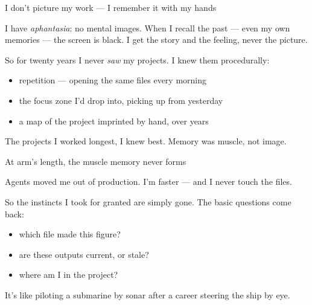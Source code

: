 \documentclass[aspectratio=169,11pt]{beamer}
\begin{document}
  \begin{frame}{I don't picture my work --- I remember it with my hands}

  I have \emph{aphantasia}: no mental images. When I recall the past --- even my own memories --- the screen is black. I get the story and the feeling, never the picture.
  
  \vspace{0.25cm}
  
  So for twenty years I never \emph{saw} my projects. I knew them procedurally:
  
  \begin{itemize}\setlength\itemsep{0.3em}
      \item repetition --- opening the same files every morning
      \item the focus zone I'd drop into, picking up from yesterday
      \item a map of the project imprinted by hand, over years
  \end{itemize}

  \vspace{0.25cm}
  
  \alert{The projects I worked longest, I knew best. Memory was muscle, not image.}
  
  \end{frame}
  

  \begin{frame}{At arm's length, the muscle memory never forms}
  
  Agents moved me out of production. I'm faster --- and I never touch the files.
  
  \vspace{0.25cm}
  
  So the instincts I took for granted are simply gone. The basic questions come back:
  
  \begin{itemize}\setlength\itemsep{0.3em}
      \item which file made this figure?
      \item are these outputs current, or stale?
      \item where am I in the project?
  \end{itemize}

  \vspace{0.25cm}
  
  \alert{It's like piloting a submarine by sonar after a career steering the ship by eye.}
  
  \end{frame}
  
\end{document}
